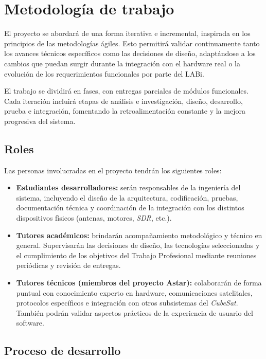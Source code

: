 \section*{Metodología de trabajo}

El proyecto se abordará de una forma iterativa e incremental, inspirada en los principios de las metodologías ágiles. Esto permitirá validar continuamente tanto los avances técnicos específicos como las decisiones de diseño, adaptándose a los cambios que puedan surgir durante la integración con el hardware real o la evolución de los requerimientos funcionales por parte del LABi.

El trabajo se dividirá en fases, con entregas parciales de módulos funcionales. Cada iteración incluirá etapas de análisis e investigación, diseño, desarrollo, prueba e integración, fomentando la retroalimentación constante y la mejora progresiva del sistema.

\subsection*{Roles}

Las personas involucradas en el proyecto tendrán los siguientes roles:

\begin{itemize}
    \item \textbf{Estudiantes desarrolladores:} serán responsables de la ingeniería del sistema, incluyendo el diseño de la arquitectura, codificación, pruebas, documentación técnica y coordinación de la integración con los distintos dispositivos físicos (antenas, motores, \textit{SDR}, etc.).
    
    \item \textbf{Tutores académicos:} brindarán acompañamiento metodológico y técnico en general. Supervisarán las decisiones de diseño, las tecnologías seleccionadas y el cumplimiento de los objetivos del Trabajo Profesional mediante reuniones periódicas y revisión de entregas.
    
    \item \textbf{Tutores técnicos (miembros del proyecto Astar):} colaborarán de forma puntual con conocimiento experto en hardware, comunicaciones satelitales, protocolos específicos e integración con otros subsistemas del \textit{CubeSat}. También podrán validar aspectos prácticos de la experiencia de usuario del software.
\end{itemize}
    
\subsection*{Proceso de desarrollo}

